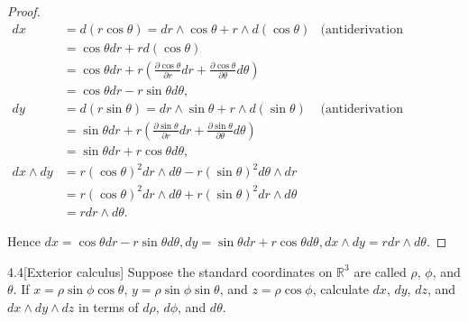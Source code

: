 \begin{proof}
	\begingroup
	\allowdisplaybreaks%
	\begin{align*}
		dx           & = d(r\cos\theta) = dr \wedge \cos\theta + r\wedge d(\cos\theta)                                                                 & \text{(antiderivation property)} \\
		             & = \cos\theta dr + r d(\cos\theta)                                                                                                                                  \\
		             & = \cos\theta dr + r \left(\frac{\partial \cos\theta}{\partial r} dr + \frac{\partial \cos\theta}{\partial \theta}d\theta\right)                                    \\
		             & = \cos\theta dr - r\sin\theta d\theta,                                                                                                                             \\
		dy           & = d(r\sin\theta) = dr \wedge \sin\theta + r\wedge d(\sin\theta)                                                                 & \text{(antiderivation property)} \\
		             & = \sin\theta dr + r\left(\frac{\partial \sin\theta}{\partial r} dr + \frac{\partial \sin\theta}{\partial\theta} d\theta\right)                                     \\
		             & = \sin\theta dr + r\cos\theta d\theta,                                                                                                                             \\
		dx \wedge dy & = r{(\cos\theta)}^{2} dr \wedge d\theta - r{(\sin\theta)}^{2} d\theta \wedge dr                                                                                    \\
		             & = r{(\cos\theta)}^{2} dr \wedge d\theta + r{(\sin\theta)}^{2} dr \wedge d\theta                                                                                    \\
		             & = r dr \wedge d\theta.
	\end{align*}
	\endgroup

	Hence \( dx = \cos\theta dr - r\sin\theta d\theta, dy = \sin\theta dr + r\cos\theta d\theta, dx \wedge dy = rdr \wedge d\theta \).
\end{proof}

\begin{problem}{4.4}[Exterior calculus]
Suppose the standard coordinates on \(\mathbb{R}^{3}\) are called \(\rho\), \(\phi\), and \(\theta\). If \(x = \rho\sin\phi\cos\theta\), \(y = \rho\sin\phi\sin\theta\), and \(z = \rho\cos\phi\), calculate \(dx\), \(dy\), \(dz\), and \(dx \wedge dy \wedge dz\) in terms of \(d\rho\), \(d\phi\), and \(d\theta\).
\end{problem}

